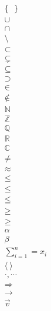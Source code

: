 \documentclass[a4paper, 11pt]{article}
\begin{document}
\begin{align*}
	\{ ~~~ \} \\
	\cup \\
	\cap \\
	\setminus \\
	\subset \\
	\subsetneq \\
	\subseteq \\
	\supset \\
	\in \\
	\notin \\
	\mathbb{N}\\
	\mathbb{Z}\\
	\mathbb{Q}\\
	\mathbb{R}\\
	\mathbb{C}\\
	\neq \\
	\approx \\
	\le \\
	\leq \\
	\leqq \\
	\ge \\
	\geq \\
	\alpha\\
	\beta \\
	\sum_{i=1}^{n} = x_i \\
	\langle ~ \rangle \\
	\cdot,\cdots \\
	\Rightarrow \\
	\rightarrow \\
	\vec{v}\\
\end{align*}

\printbibliography
\end{document}

